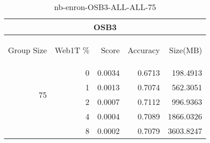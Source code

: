 \begin{center}
\begin{table}[htbp] 
 \begin{center}
\begin{tabular}{ | r | r | r | r | r |}
\hline
\multicolumn{5}{|c|}{OSB3}\\
\hline
\begin{sideways}Group Size\end{sideways} & \begin{sideways}Web1T \%\end{sideways} & \begin{sideways}Score\end{sideways} & \begin{sideways}Accuracy\end{sideways} & \begin{sideways}Size(MB)\end{sideways}\\
\hline
\multirow{4}{*}{75}
 & 0 & 0.0034 & 0.6713 & 198.4913\\ \cline{2-5}
 & 1 & 0.0013 & 0.7074 & 562.3051\\ \cline{2-5}
 & 2 & 0.0007 & 0.7112 & 996.9363\\ \cline{2-5}
 & 4 & 0.0004 & 0.7089 & 1866.0326\\ \cline{2-5}
 & 8 & 0.0002 & 0.7079 & 3603.8247\\ \cline{2-5}
\hline
\end{tabular}
\caption{nb-enron-OSB3-ALL-ALL-75}
\label{table:nb-enron-OSB3-ALL-ALL-75}
\end{center}
 \end{table}
\end{center}

